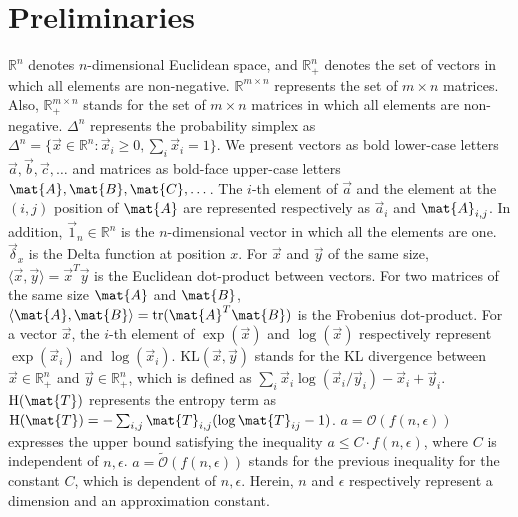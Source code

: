 \section{Preliminaries}
\label{sec:Preliminaries}
$\mathbb{R}^n$ denotes $n$-dimensional Euclidean space, and $\mathbb{R}^n_+$ denotes the set of vectors in which all elements are non-negative. $\mathbb{R}^{m \times n}$ represents the set of $m \times n$ matrices. Also, $\mathbb{R}^{m \times n}_+$ stands for the set of $m \times n$ matrices in which all elements are non-negative. $\Delta^n$ represents the probability simplex as $\Delta^n = \lbrace \vec{x} \in \mathbb{R}^n : \vec{x}_i \geq 0 , \sum_i \vec{x}_i = 1 \rbrace$. We present vectors as bold lower-case letters $\vec{a},\vec{b},\vec{c},\dots$ and matrices as bold-face upper-case letters $\mat{A},\mat{B},\mat{C},\dots$. The $i$-th element of $\vec{a}$ and the element at the $(i,j)$ position of $\mat{A}$ are represented respectively as $\vec{a}_i$ and $\mat{A}_{i,j}$. In addition, $\vec{1}_n \in \mathbb{R}^n$ is the $n$-dimensional vector in which all the elements are one. $\vec{\delta}_{x}$ is the Delta function at position $x$. For $\vec{x}$ and $\vec{y}$ of the same size, $\langle \vec{x},\vec{y} \rangle = \vec{x}^T\vec{y}$ is the Euclidean dot-product between vectors. For two matrices of the same size $\mat{A}$ and $\mat{B}$, $\langle \mat{A},\mat{B}\rangle={\rm tr}(\mat{A}^T\mat{B})$ is the Frobenius dot-product. For a vector $\vec{x}$, the $i$-th element of $\exp (\vec{x})$ and $\log (\vec{x})$ respectively represent $\exp (\vec{x}_i)$ and $\log (\vec{x}_i)$. $\mathrm{KL}(\vec{x},\vec{y})$ stands for the KL divergence between $\vec{x} \in \mathbb{R}_+^n$ and $\vec{y} \in \mathbb{R}_+^n$, which is defined as $\sum_i \vec{x}_i \log {(\vec{x}_i/\vec{y}_i)} - \vec{x}_i + \vec{y}_i$. $\mathrm{H}(\mat{T})$ represents the entropy term as $\mathrm{H}(\mat{T})=-\sum_{i,j}\mat{T}_{i,j}(\log \mat{T}_{ij}-1)$. $a = \mathcal{O}(f(n,\epsilon))$ expresses the {upper bound} satisfying the inequality $a \leq C \cdot f(n,\epsilon)$, where $C$ is independent of $n,\epsilon$. $a = \tilde{\mathcal{O}} (f(n,\epsilon))$ stands for the previous inequality for the constant $C$, which is dependent of $n,\epsilon$. Herein, $n$ and $\epsilon$ respectively represent a dimension and an approximation constant.

